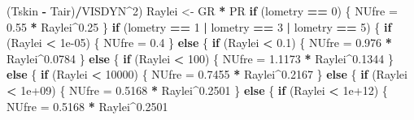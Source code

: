 \documentclass[]{article}
\newenvironment{Shaded}{\begin{snugshade}}{\end{snugshade}}
\newcommand{\DecValTok}[1]{\textcolor[rgb]{0.00,0.00,0.81}{#1}}
\newcommand{\FloatTok}[1]{\textcolor[rgb]{0.00,0.00,0.81}{#1}}
\newcommand{\StringTok}[1]{\textcolor[rgb]{0.31,0.60,0.02}{#1}}
\newcommand{\ControlFlowTok}[1]{\textcolor[rgb]{0.13,0.29,0.53}{\textbf{#1}}}
\newcommand{\OperatorTok}[1]{\textcolor[rgb]{0.81,0.36,0.00}{\textbf{#1}}}
\newcommand{\NormalTok}[1]{#1}
\begin{document}
\begin{Shaded}
\begin{Highlighting}[]
\StringTok{        }\NormalTok{(Tskin }\OperatorTok{-}\StringTok{ }\NormalTok{Tair)}\OperatorTok{/}\NormalTok{VISDYN}\OperatorTok{^}\DecValTok{2}\NormalTok{)}
\NormalTok{    Raylei <-}\StringTok{ }\NormalTok{GR }\OperatorTok{*}\StringTok{ }\NormalTok{PR}
    \ControlFlowTok{if}\NormalTok{ (lometry }\OperatorTok{==}\StringTok{ }\DecValTok{0}\NormalTok{) \{}
\NormalTok{        NUfre =}\StringTok{ }\FloatTok{0.55} \OperatorTok{*}\StringTok{ }\NormalTok{Raylei}\OperatorTok{^}\FloatTok{0.25}
\NormalTok{    \}}
    \ControlFlowTok{if}\NormalTok{ (lometry }\OperatorTok{==}\StringTok{ }\DecValTok{1} \OperatorTok{|}\StringTok{ }\NormalTok{lometry }\OperatorTok{==}\StringTok{ }\DecValTok{3} \OperatorTok{|}\StringTok{ }\NormalTok{lometry }\OperatorTok{==}\StringTok{ }\DecValTok{5}\NormalTok{) \{}
        \ControlFlowTok{if}\NormalTok{ (Raylei }\OperatorTok{<}\StringTok{ }\FloatTok{1e-05}\NormalTok{) \{}
\NormalTok{            NUfre =}\StringTok{ }\FloatTok{0.4}
\NormalTok{        \}}
        \ControlFlowTok{else}\NormalTok{ \{}
            \ControlFlowTok{if}\NormalTok{ (Raylei }\OperatorTok{<}\StringTok{ }\FloatTok{0.1}\NormalTok{) \{}
\NormalTok{                NUfre =}\StringTok{ }\FloatTok{0.976} \OperatorTok{*}\StringTok{ }\NormalTok{Raylei}\OperatorTok{^}\FloatTok{0.0784}
\NormalTok{            \}}
            \ControlFlowTok{else}\NormalTok{ \{}
                \ControlFlowTok{if}\NormalTok{ (Raylei }\OperatorTok{<}\StringTok{ }\DecValTok{100}\NormalTok{) \{}
\NormalTok{                  NUfre =}\StringTok{ }\FloatTok{1.1173} \OperatorTok{*}\StringTok{ }\NormalTok{Raylei}\OperatorTok{^}\FloatTok{0.1344}
\NormalTok{                \}}
                \ControlFlowTok{else}\NormalTok{ \{}
                  \ControlFlowTok{if}\NormalTok{ (Raylei }\OperatorTok{<}\StringTok{ }\DecValTok{10000}\NormalTok{) \{}
\NormalTok{                    NUfre =}\StringTok{ }\FloatTok{0.7455} \OperatorTok{*}\StringTok{ }\NormalTok{Raylei}\OperatorTok{^}\FloatTok{0.2167}
\NormalTok{                  \}}
                  \ControlFlowTok{else}\NormalTok{ \{}
                    \ControlFlowTok{if}\NormalTok{ (Raylei }\OperatorTok{<}\StringTok{ }\FloatTok{1e+09}\NormalTok{) \{}
\NormalTok{                      NUfre =}\StringTok{ }\FloatTok{0.5168} \OperatorTok{*}\StringTok{ }\NormalTok{Raylei}\OperatorTok{^}\FloatTok{0.2501}
\NormalTok{                    \}}
                    \ControlFlowTok{else}\NormalTok{ \{}
                      \ControlFlowTok{if}\NormalTok{ (Raylei }\OperatorTok{<}\StringTok{ }\FloatTok{1e+12}\NormalTok{) \{}
\NormalTok{                        NUfre =}\StringTok{ }\FloatTok{0.5168} \OperatorTok{*}\StringTok{ }\NormalTok{Raylei}\OperatorTok{^}\FloatTok{0.2501}

\end{Highlighting}
\end{Shaded}
\end{document}
